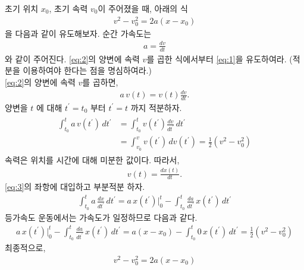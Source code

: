 \documentclass[floatfix,nofootinbib,superscriptaddress,fleqn,preprint]{revtex4}
\begin{document}
 초기 위치 $x_0$, 초기 속력 $v_0$이
주어졌을 때, 아래의 식
\begin{align}
  \label{eq:1}
v^2 - v_0^2 = 2a(x-x_0)  
\end{align}
을 다음과 같이 유도해보자. 순간 가속도는
\begin{align}
  \label{eq:2}
a = \frac{dv}{dt}
\end{align}
와 같이 주어진다. \eqref{eq:2}의 양변에 속력 $v$를 곱한 식에서부터
\eqref{eq:1}을 유도하여라. (적분을 이용하여야 한다는 점을 명심하여라.)  \\
 \eqref{eq:2}의 양변에 속력 $v$를 곱하면,
\begin{align}
  a\,v(t) = v(t)\frac{dv}{dt}.
\end{align}
양변을 $t$ 에 대해 $t^{\prime}=t_0$ 부터 $t^\prime=t$ 까지 적분하자.
\begin{align}\label{eq:3}
  \begin{split}
    \int_{t_0}^t a\,v(t^\prime)\,dt^\prime 
    &=\int_{t_0}^t v(t^\prime)\frac{dv}{dt^\prime}\,dt^\prime  \\
    &= \int_{v_0}^v v(t^\prime)\,dv(t^\prime)
    =\frac{1}{2}\left(v^2-v^2_0\right)
  \end{split}
\end{align} 
속력은 위치를 시간에 대해 미분한 값이다. 따라서,
\begin{align}
  v(t)=\frac{dx(t)}{dt}.
\end{align}
\eqref{eq:3}의 좌항에 대입하고 부분적분 하자.
\begin{align}
  \int_{t_0}^ta\,\frac{dx}{dt^\prime}\,dt^\prime
  =a\,x(t^\prime)|_{0}^t-\int_{t_0}^t\frac{da}{dt^\prime}\,x(t^\prime) \,dt^\prime
\end{align}
등가속도 운동에서는 가속도가 일정하므로 다음과 같다.
\begin{align}
  a\,x(t^\prime)|_{0}^t-\int_{t_0}^t\frac{da}{dt^\prime}\,x(t^\prime) \,dt^\prime
  =a\left(x-x_0\right)-\int_{t_0}^t0\,x(t^\prime) \,dt^\prime
  =\frac{1}{2}\left(v^2-v^2_0\right)
\end{align}
최종적으로,
\begin{align}
  v^2 - v_0^2 = 2a(x-x_0)  
\end{align}

\vspace{2cm}
\end{document}
